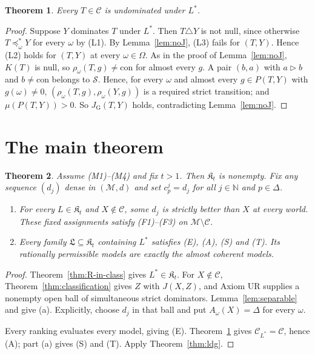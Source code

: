 \documentclass[11pt]{article}
\newtheorem{theorem}{Theorem}[section]
\theoremstyle{definition}
\newcommand{\M}{\mathcal M}
\newcommand{\C}{\mathcal C}
\newcommand{\K}{\mathfrak K}
\newcommand{\Lf}{\mathfrak L}
\newcommand{\con}{\mathrm{con}}
\newcommand{\GU}{\mathrm{G}}
\begin{document}
\begin{theorem}\label{thm:protection}
Every $T\in\C$ is undominated under $L^\ast$.
\end{theorem}

\begin{proof}
Suppose $Y$ dominates $T$ under $L^\ast$. Then $T\triangle Y$ is not null, since otherwise $T\preceq^\ast_\omega Y$ for every $\omega$ by (L1). By Lemma~\ref{lem:noJ}, (L3) fails for $(T,Y)$. Hence (L2) holds for $(T,Y)$ at every $\omega\in\Omega$. As in the proof of Lemma~\ref{lem:noJ}, $K(T)$ is null, so $\rho_\omega(T,g)\ne\con$ for almost every $g$. A pair $(b,a)$ with $a\rhd b$ and $b\ne\con$ belongs to $\mathcal S$. Hence, for every $\omega$ and almost every $g\in P(T,Y)$ with $g(\omega)\ne0$, $(\rho_\omega(T,g),\rho_\omega(Y,g))$ is a required strict transition; and $\mu(P(T,Y))>0$. So $J_\GU(T,Y)$ holds, contradicting Lemma~\ref{lem:noJ}.
\end{proof}

\section{The main theorem}\label{sec:main}

\begin{theorem}\label{thm:main}
Assume (M1)--(M4) and fix $t>1$. Then $\K_t$ is nonempty. Fix any sequence $(d_j)$ dense in $(\M,d)$ and set $c^j_p=d_j$ for all $j\in\mathbb N$ and $p\in\Delta$.
\begin{enumerate}[label=(\alph*)]
\item For every $L\in\K_t$ and $X\notin\C$, some $d_j$ is strictly better than $X$ at every world. These fixed assignments satisfy (F1)--(F3) on $\M\setminus\C$.
\item Every family $\Lf\subseteq\K_t$ containing $L^\ast$ satisfies (E), (A), (S) and (T). Its rationally permissible models are exactly the almost coherent models.
\end{enumerate}
\end{theorem}
\begin{proof}
Theorem~\ref{thm:R-in-class} gives $L^\ast\in\K_t$. For $X\notin\C$, Theorem~\ref{thm:classification} gives $Z$ with $J(X,Z)$, and Axiom UR supplies a nonempty open ball of simultaneous strict dominators. Lemma~\ref{lem:separable} and \cite[Corollary~2.7]{LDG} give (a). Explicitly, choose $d_j$ in that ball and put $A_\omega(X)=\Delta$ for every $\omega$.

Every ranking evaluates every model, giving (E). Theorem~\ref{thm:protection} gives $\C_{L^\ast}=\C$, hence (A); part (a) gives (S) and (T). Apply Theorem~\ref{thm:ldg}.
\end{proof}
\end{document}
